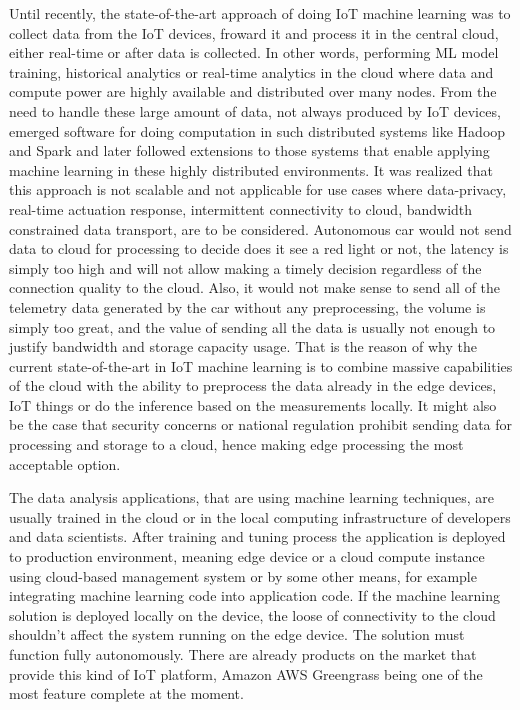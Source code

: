 \documentclass[english, 12pt, a4paper, elec, utf8, online]{aaltothesis}
\begin{document}
Until recently, the state-of-the-art approach of doing IoT machine learning was to collect data from the IoT devices, froward it and process it in the central cloud, either real-time or after data is collected. In other words, performing ML model training, historical analytics or real-time analytics in the cloud where data and compute power are highly available and distributed over many nodes. From the need to handle these large amount of data, not always produced by IoT devices, emerged software for doing computation in such distributed systems like Hadoop and Spark and later
followed extensions to those systems that enable applying machine learning in these highly distributed environments. It was realized that this approach is not scalable and not applicable for use cases where data-privacy, real-time actuation response, intermittent connectivity to cloud, bandwidth constrained data transport, are to be considered. Autonomous car would not send data to cloud for processing to decide does it see a red light or not, the latency is simply too high and will not allow making a timely decision regardless of the connection quality to the cloud. Also, it would not  make sense to send all of the telemetry data generated by the car without any preprocessing, the volume is simply too great, and the value of sending all the data is usually not enough to justify bandwidth and storage capacity usage. That is the reason of why the current state-of-the-art in IoT machine learning is to combine massive capabilities of the cloud with the ability to preprocess the data already in the edge devices, IoT things or do the inference based on the measurements locally.  It might also be the case that security concerns or national regulation prohibit sending data for processing and storage to a cloud, hence making edge processing the most acceptable option.~\cite{stolpe2016internet} 

The data analysis applications, that are using machine learning techniques, are usually trained in the cloud or in the local computing infrastructure of developers and data scientists. After training and tuning process the application is deployed to production environment, meaning edge device or a cloud compute instance using cloud-based management system or by some other means, for example integrating machine learning code into application code. If the machine learning solution is deployed locally on the device, the loose of connectivity to the cloud shouldn't affect the system running on the edge device. The solution must function fully autonomously. There are already products on the market that provide this kind of IoT platform, Amazon AWS Greengrass being one of the most feature complete at the moment.
\end{document}
